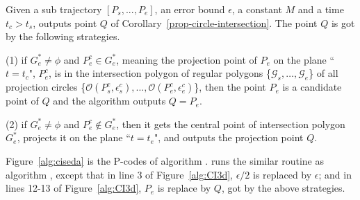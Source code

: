 %

Given a sub trajectory $[P_s,...,P_e]$, an error bound $\epsilon$, a constant $M$ and a time $t_c > t_s$, \cista outputs point $Q$ of Corollary~\ref{prop-circle-intersection}. The point $Q$ is got by the following strategies.

\vspace{1ex}
\ni (1) if $G^*_e \ne \phi$ and $P^c_e \in G^*_e$, meaning the projection point of $P_e$ on the plane ``$t=t_c$", \ie $P^c_e$, is in the intersection polygon of regular polygons \{$\mathcal{G}_s, \dots, \mathcal{G}_e$\} of all projection circles \{$\mathcal{O}(P^c_s, \epsilon^c_s), \ldots, \mathcal{O}(P^c_e, \epsilon^c_e)$\}, then the point $P_e$ is a candidate point of $Q$ and the algorithm outputs $Q=P_e$.

\vspace{1ex}
\ni (2) if $G^*_e \ne \phi$ and $P^c_e \notin G^*_e$, then it gets the central point of intersection polygon $G^*_e$, projects it on the plane ``$t=t_e$", and outputs the projection point $Q$.

\vspace{1ex}
Figure~\ref{alg:ciseda} is the P-codes of algorithm \cista. \cista runs the similar routine as algorithm \cist, except that in line 3 of Figure~\ref{alg:CI3d}, $\epsilon/2$ is replaced by $\epsilon$; and in lines 12-13 of Figure~\ref{alg:CI3d}, $P_e$ is replace by $Q$, got by the above strategies.


